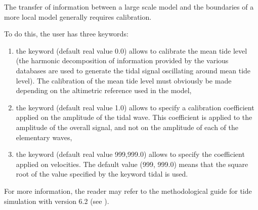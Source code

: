  The transfer of information between a large scale model and the boundaries of a more local model generally requires calibration.

 To do this, the user has three keywords:

\begin{enumerate}
\item  the keyword  (default real value 0.0) allows to calibrate the mean tide level (the harmonic decomposition of information provided by the various databases are used to generate the tidal signal oscillating around mean tide level). The calibration of the mean tide level must obviously be made depending on the altimetric reference used in the model,

\item  the keyword  (default real value 1.0) allows to specify a calibration coefficient applied on the amplitude of the tidal wave. This coefficient is applied to the amplitude of the overall signal, and not on the amplitude of each of the elementary waves,

\item  the keyword  (default real value 999,999.0) allows to specify the coefficient applied on velocities. The default value (999, 999.0) means that the square root of the value specified by the keyword  tidal is used.
\end{enumerate}

 For more information, the reader may refer to the methodological guide for tide simulation with version 6.2 (see \cite{Pham2012}).
